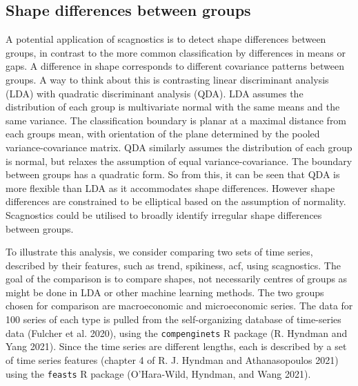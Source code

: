 \hypertarget{shape-differences-between-groups}{%
\subsection{Shape differences between groups}\label{shape-differences-between-groups}}

A potential application of scagnostics is to detect shape differences between groups, in contrast to the more common classification by differences in means or gaps. A difference in shape corresponds to different covariance patterns between groups. A way to think about this is contrasting linear discriminant analysis (LDA) with quadratic discriminant analysis (QDA). LDA assumes the distribution of each group is multivariate normal with the same means and the same variance. The classification boundary is planar at a maximal distance from each groups mean, with orientation of the plane determined by the pooled variance-covariance matrix. QDA similarly assumes the distribution of each group is normal, but relaxes the assumption of equal variance-covariance. The boundary between groups has a quadratic form. So from this, it can be seen that QDA is more flexible than LDA as it accommodates shape differences. However shape differences are constrained to be elliptical based on the assumption of normality. Scagnostics could be utilised to broadly identify irregular shape differences between groups.

To illustrate this analysis, we consider comparing two sets of time series, described by their features, such as trend, spikiness, acf, using scagnostics. The goal of the comparison is to compare shapes, not necessarily centres of groups as might be done in LDA or other machine learning methods. The two groups chosen for comparison are macroeconomic and microeconomic series. The data for 100 series of each type is pulled from the self-organizing database of time-series data (Fulcher et al. 2020), using the \texttt{compenginets} R package (R. Hyndman and Yang 2021). Since the time series are different lengths, each is described by a set of time series features (chapter 4 of R. J. Hyndman and Athanasopoulos 2021) using the \texttt{feasts} R package (O'Hara-Wild, Hyndman, and Wang 2021).


